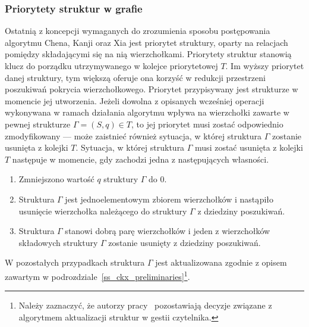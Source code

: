\subsubsection{\textbf{Priorytety struktur w grafie}}
\label{sss_ckx_priorities}
\par{
  Ostatnią z koncepcji wymaganych do zrozumienia sposobu postępowania algorytmu Chena, Kanji oraz Xia jest priorytet struktury, oparty na relacjach pomiędzy składającymi się na nią wierzchołkami.
  Priorytety struktur stanowią klucz do porządku utrzymywanego w kolejce priorytetowej $T$.
  Im wyższy priorytet danej struktury, tym większą oferuje ona korzyść w redukcji przestrzeni poszukiwań pokrycia wierzchołkowego.
  Priorytet przypisywany jest strukturze w momencie jej utworzenia.
  Jeżeli dowolna z opisanych wcześniej operacji wykonywana w ramach działania algorytmu wpływa na wierzchołki zawarte w pewnej strukturze $\Gamma=(S, q) \in T$, to jej priorytet musi zostać odpowiednio zmodyfikowany --- może zaistnieć również sytuacja, w której struktura $\Gamma$ zostanie usunięta z kolejki $T$.
  Sytuacja, w której struktura $\Gamma$ musi zostać usunięta z kolejki $T$ następuje w momencie, gdy zachodzi jedna z następujących własności.
  \begin{enumerate}
    \item Zmniejszono wartość $q$ struktury $\Gamma$ do $0$.
    \item Struktura $\Gamma$ jest jednoelementowym zbiorem wierzchołków i nastąpiło usunięcie wierzchołka należącego do struktury $\Gamma$ z dziedziny poszukiwań.
    \item Struktura $\Gamma$ stanowi dobrą parę wierzchołków i jeden z wierzchołków składowych struktury $\Gamma$ zostanie usunięty z dziedziny poszukiwań.
  \end{enumerate}
  
  W pozostałych przypadkach struktura $\Gamma$ jest aktualizowana zgodnie z opisem zawartym w podrozdziale~\ref{ss_ckx_preliminaries}\footnote{Należy zaznaczyć, że autorzy pracy~\cite{ImprovedBounds10} pozostawiają decyzje związane z algorytmem aktualizacji struktur w gestii czytelnika.}.

}
